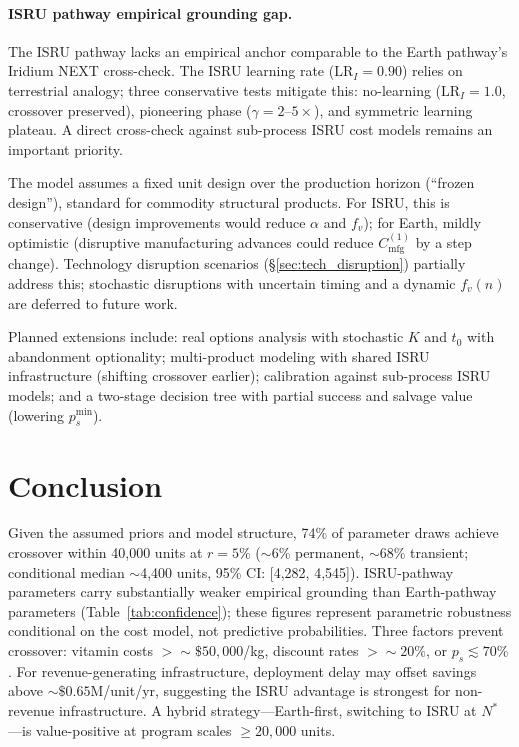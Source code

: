 \documentclass[preprint,12pt]{elsarticle}
\begin{document}
\paragraph{ISRU pathway empirical grounding gap.} The ISRU pathway lacks an empirical anchor comparable to the Earth pathway's Iridium NEXT cross-check. The ISRU learning rate ($\mathrm{LR}_I = 0.90$) relies on terrestrial analogy; three conservative tests mitigate this: no-learning ($\mathrm{LR}_I = 1.0$, crossover preserved), pioneering phase ($\gamma = 2$--$5\times$), and symmetric learning plateau. A direct cross-check against sub-process ISRU cost models remains an important priority.

The model assumes a fixed unit design over the production horizon (``frozen design''), standard for commodity structural products. For ISRU, this is conservative (design improvements would reduce $\alpha$ and $f_v$); for Earth, mildly optimistic (disruptive manufacturing advances could reduce $C_{\mathrm{mfg}}^{(1)}$ by a step change). Technology disruption scenarios (\S\ref{sec:tech_disruption}) partially address this; stochastic disruptions with uncertain timing and a dynamic $f_v(n)$ are deferred to future work.

Planned extensions include: real options analysis with stochastic $K$ and $t_0$ with abandonment optionality; multi-product modeling with shared ISRU infrastructure (shifting crossover earlier); calibration against sub-process ISRU models; and a two-stage decision tree with partial success and salvage value (lowering $p_s^{\min}$).

\section{Conclusion}
\label{sec:conclusion}

Given the assumed priors and model structure, 74\% of parameter draws achieve crossover within 40{,}000 units at $r = 5\%$ (${\sim}$6\% permanent, ${\sim}$68\% transient; conditional median $\sim$4{,}400 units, 95\% CI: [4{,}282, 4{,}545]). ISRU-pathway parameters carry substantially weaker empirical grounding than Earth-pathway parameters (Table~\ref{tab:confidence}); these figures represent parametric robustness conditional on the cost model, not predictive probabilities. Three factors prevent crossover: vitamin costs $> {\sim}\$50{,}000$/kg, discount rates $> {\sim}20\%$, or $p_s \lesssim 70\%$. For revenue-generating infrastructure, deployment delay may offset savings above ${\sim}\$0.65$M/unit/yr, suggesting the ISRU advantage is strongest for non-revenue infrastructure. A hybrid strategy---Earth-first, switching to ISRU at $N^*$---is value-positive at program scales $\geq 20{,}000$ units.
\end{document}
